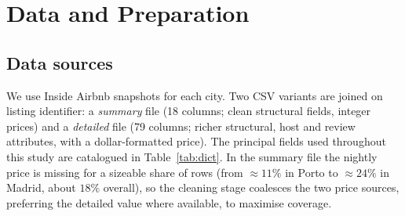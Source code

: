 \documentclass[conference]{IEEEtran}
\begin{document}
\section{Data and Preparation}

\subsection{Data sources}
We use Inside Airbnb snapshots for each city. Two CSV variants are joined on listing identifier: a \emph{summary} file (18 columns; clean structural fields, integer prices) and a \emph{detailed} file (79 columns; richer structural, host and review attributes, with a dollar-formatted price). The principal fields used throughout this study are catalogued in Table~\ref{tab:dict}. In the summary file the nightly price is missing for a sizeable share of rows (from $\approx 11\%$ in Porto to $\approx 24\%$ in Madrid, about $18\%$ overall), so the cleaning stage coalesces the two price sources, preferring the detailed value where available, to maximise coverage.
\end{document}
